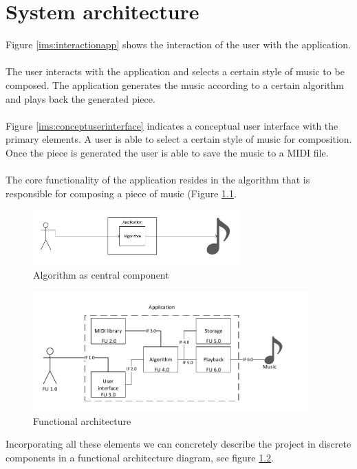 \chapter{System architecture}

Figure \ref{ims:interactionapp} shows the interaction of the user with the application. 
\\\\
The user interacts with the application and selects a certain style of music to be composed. The application generates the music according to a certain algorithm and plays back the generated piece. 
\\\\
Figure \ref{ims:conceptuserinterface} indicates a conceptual user interface with the primary elements. A user is able to select a certain style of music for composition. Once the piece is generated the user is able to save the music to a \ac{MIDI} file.
\\\\
The core functionality of the application resides in the algorithm that is responsible for composing a piece of music (Figure \ref{ims:useralgoaud}.


\begin{figure}
\centerline{\includegraphics[width=300px]{../images/user-algorithm-audio.pdf}}
\caption{Algorithm as central component}
\label{ims:useralgoaud}
\end{figure}


\begin{figure}
\centerline{\includegraphics[width=400px]{../images/architecture.pdf}}
\caption{Functional architecture}
\label{ims:funcarch}
\end{figure}

Incorporating all these elements we can concretely describe the project in discrete components in a functional architecture diagram, see figure \ref{ims:funcarch}.

